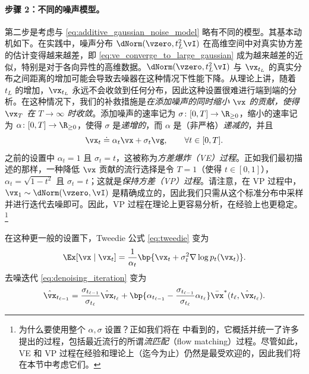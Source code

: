 \documentclass[../../book-main_zh.tex]{subfiles}
\begin{document}
\paragraph{步骤 2：不同的噪声模型。} 第二步是考虑与 \eqref{eq:additive_gaussian_noise_model} 略有不同的模型。其基本动机如下。在实践中，噪声分布 \(\dNorm(\vzero, t_{L}^{2}\vI)\) 在高维空间中对真实协方差的估计变得越来越差，即 \eqref{eq:ve_converge_to_large_gaussian} 成为越来越差的近似，特别是对于各向异性的高维数据。\(\dNorm(\vzero, t_{L}^{2}\vI)\) 与 \(\vx_{t_{L}}\) 的真实分布之间距离的增加可能会导致去噪器在这种情况下性能下降。从理论上讲，随着 \(t_{L}\) 的增加，\(\vx_{t_{L}}\) 永远不会收敛到任何分布，因此这种设置很难进行端到端的分析。在这种情况下，我们的补救措施是\textit{在添加噪声的同时缩小 \(\vx\) 的贡献，使得 \(\vx_{T}\) 在 \(T \to \infty\) 时收敛}。添加噪声的速率记为 \(\sigma \colon [0,
T] \to \R_{\geq 0}\)，缩小的速率记为 \(\alpha \colon [0, T] \to \R_{\geq 0}\)，使得 \(\sigma\) 是\textit{递增的}，而 \(\alpha\) 是（非严格）\textit{递减的}，并且
\begin{equation}\label{eq:gen_additive_gaussian_noise_model}
    \vx_{t} \doteq \alpha_{t}\vx + \sigma_{t}\vg, \qquad \forall t \in [0, T].
\end{equation}
之前的设置中 \(\alpha_{t} = 1\) 且 \(\sigma_{t} = t\)，这被称为\textit{方差爆炸（VE）过程}。正如我们最初描述的那样，一种降低 \(\vx\) 贡献的流行选择是令 \(T = 1\)（使得 \(t \in [0, 1]\)），\(\alpha_{t} = \sqrt{1 - t^{2}}\) 且 \(\sigma_{t} = t\)；这就是\textit{保持方差（VP）过程}。请注意，在 VP 过程中，\(\vx_{1} \sim \dNorm(\vzero, \vI)\) 是精确成立的，因此我们只需从这个标准分布中采样并进行迭代去噪即可。因此，VP 过程在理论上更容易分析，在经验上也更稳定。\footnote{为什么要使用整个 \(\alpha,
    \sigma\) 设置？正如我们将在  中看到的，它概括并统一了许多提出的过程，包括最近流行的所谓\textit{流匹配}（flow matching）过程。尽管如此，VE 和 VP 过程在经验和理论上（迄今为止）仍然是最受欢迎的，因此我们将在本节中考虑它们。}

在这种更一般的设置下，Tweedie 公式 \eqref{eq:tweedie} 变为
\begin{equation}\label{eq:gen_tweedie}
    \Ex[\vx \mid \vx_{t}] = \frac{1}{\alpha_{t}}\bp{\vx_{t} +
    \sigma_{t}^{2}\nabla \log p_{t}(\vx_{t})}.
\end{equation}
去噪迭代 \eqref{eq:denoising_iteration} 变为
\begin{equation}\label{eq:gen_denoising_iteration}
    \hat{\vx}_{t_{\ell - 1}} = \frac{\sigma_{t_{\ell -
    1}}}{\sigma_{t_{\ell}}}\hat{\vx}_{t_{\ell}} + \bp{\alpha_{t_{\ell
        - 1}} - \frac{\sigma_{t_{\ell -
    1}}}{\sigma_{t_{\ell}}}\alpha_{t_{\ell}}}\bar{\vx}^{\ast}(t_{\ell},
    \hat{\vx}_{t_{\ell}}).
\end{equation}
\end{document}
